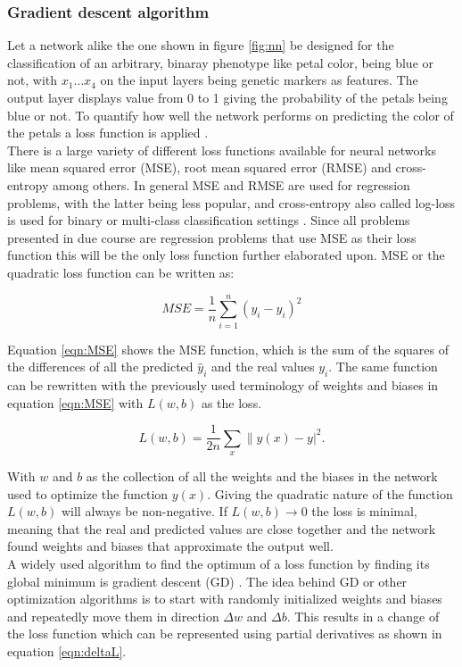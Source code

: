 \subsubsection{Gradient descent algorithm}

Let a network alike the one shown in figure \ref{fig:nn} be designed for the
classification of an arbitrary, binaray phenotype like petal color, being blue or not, with $x_1 \dots x_4$ on the
input layers being genetic markers as features. The output layer displays value from 0 to
1 giving the probability of the petals being blue or not. To quantify how well the network
performs on predicting the color of the petals a loss
function is applied \cite{schmidhuber2015deep}. \\
There is a large variety of different loss functions available for neural networks like
mean squared error (MSE), root mean squared error (RMSE) and cross-entropy among
others. In general MSE and RMSE are used for regression problems, with the latter being
less popular, and cross-entropy also called log-loss is used for binary or multi-class
classification settings \cite{janocha2017loss}. Since all problems presented in due course
are regression problems that use MSE as their loss function this will be the only loss
function further elaborated upon. MSE or the quadratic loss function can be written as:

\begin{equation}
 MSE = \frac{1}{n} \sum_{i=1}^n (y_i - \hat{y}_i)^2
 \label{eqn:MSE}
\end{equation}

Equation \ref{eqn:MSE} shows the MSE function, which is the sum of the squares of the
differences of all the predicted $\hat{y}_i$ and the real values $y_i$. The same function
can be rewritten with the previously used terminology of weights and biases in equation
\ref{eqn:MSE} with $L(w,b)$ as the loss.

\begin{equation}
  L(w,b) = \frac{1}{2n} \sum_x \| y(x) - y|^2.
 \label{eqn:MSE2}
\end{equation}


With $w$ and $b$ as the collection of all the weights and the biases in the network used
to optimize the function $y(x)$. Giving the quadratic nature of the function $L(w,b)$ will
always be non-negative. If $L(w,b) \rightarrow 0$ the loss is minimal, meaning
that the real and predicted values are close together and the network found weights and biases that approximate the output well. \\
A widely used algorithm to find the optimum of a loss function by finding its global
minimum is gradient descent (GD) \cite{bottou1991stochastic}. The idea behind GD or other
optimization algorithms is to start with randomly initialized weights and biases and
repeatedly move them in direction $\Delta w$ and $\Delta b$. This results in a change of
the loss function which can be represented using partial derivatives as shown in equation
\ref{eqn:deltaL}.

